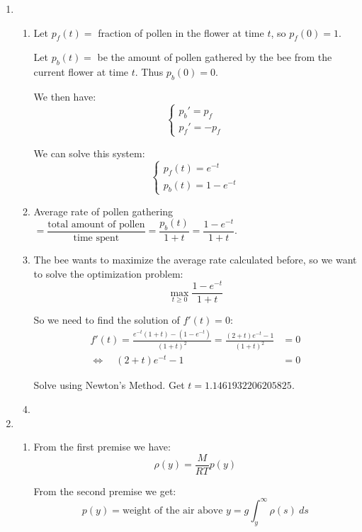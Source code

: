 \begin{enumerate}

\item 
\begin{enumerate}
\item 
Let $p_f(t) = $ fraction of pollen in the flower at time $t$, so $p_f(0)=1$.

Let $p_b(t)=$ be the amount of pollen gathered by the bee from the current flower at time $t$. Thus $p_b(0)=0$.

We then have:
\[
\begin{cases}
	p_b' =  p_f \\	
	p_f' = - p_f
\end{cases}
\]

We can solve this system:
\[
\begin{cases}
	p_f(t) = e^{-t} \\
	p_b(t) = 1- e^{-t}
\end{cases}
\]


\item 
Average rate of pollen gathering $= \dfrac{\text{total amount of pollen}}{\text{time spent}} = \dfrac{p_b(t)}{1+t} = \dfrac{1-e^{-t}}{1+t}$.

\item The bee wants to maximize the average rate calculated before, so we want to solve the optimization problem:
\[
\max_{t \geq 0} \dfrac{1-e^{-t}}{1+t}
\]

So we need to find the solution of $f'(t)=0$:
\begin{align*}
f'(t) 	= \frac{e^{-t}(1+t) - (1-e^{-t})}{(1+t)^2} 
		  = \frac{(2+t)e^{-t} - 1}{(1+t)^2} & = 0 \\
\Leftrightarrow \quad (2+t)e^{-t} - 1 & = 0
\end{align*}

Solve using Newton's Method.
Get $t= 1.1461932206205825$.



\item 

\end{enumerate}



\newpage

\item 
\begin{enumerate}
\item From the first premise we have:
\[ \rho(y) = \frac{M}{RT} p(y) \]

From the second premise we get:
\[
	p(y) 	= \text{weight of the air above } y
			= g \int_y^\infty \rho(s) ~ds
\]



\end{enumerate}
\end{enumerate}
